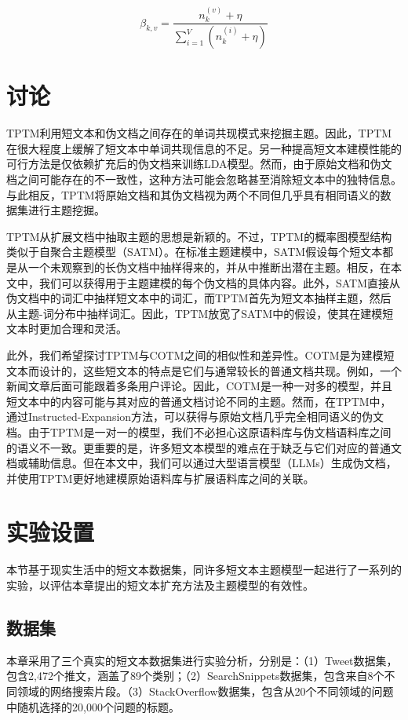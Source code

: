 \begin{equation}
    \label{beta}
    \beta_{k,v}=\frac{n_k^{(v)}+\eta}{\sum_{i=1}^V(n_k^{(i)}+\eta)}
\end{equation} 

\section{讨论}
TPTM利用短文本和伪文档之间存在的单词共现模式来挖掘主题。因此，TPTM在很大程度上缓解了短文本中单词共现信息的不足。另一种提高短文本建模性能的可行方法是仅依赖扩充后的伪文档来训练LDA模型。然而，由于原始文档和伪文档之间可能存在的不一致性，这种方法可能会忽略甚至消除短文本中的独特信息。与此相反，TPTM将原始文档和其伪文档视为两个不同但几乎具有相同语义的数据集进行主题挖掘。

TPTM从扩展文档中抽取主题的思想是新颖的。不过，TPTM的概率图模型结构类似于自聚合主题模型（SATM）\cite{SATM}。在标准主题建模中，SATM假设每个短文本都是从一个未观察到的长伪文档中抽样得来的，并从中推断出潜在主题。相反，在本文中，我们可以获得用于主题建模的每个伪文档的具体内容。此外，SATM直接从伪文档中的词汇中抽样短文本中的词汇，而TPTM首先为短文本抽样主题，然后从主题-词分布中抽样词汇。因此，TPTM放宽了SATM中的假设，使其在建模短文本时更加合理和灵活。

此外，我们希望探讨TPTM与COTM\cite{COTM}之间的相似性和差异性。COTM是为建模短文本而设计的，这些短文本的特点是它们与通常较长的普通文档共现。例如，一个新闻文章后面可能跟着多条用户评论。因此，COTM是一种一对多的模型，并且短文本中的内容可能与其对应的普通文档讨论不同的主题。然而，在TPTM中，通过Instructed-Expansion方法，可以获得与原始文档几乎完全相同语义的伪文档。由于TPTM是一对一的模型，我们不必担心这原语料库与伪文档语料库之间的语义不一致。更重要的是，许多短文本模型的难点在于缺乏与它们对应的普通文档或辅助信息。但在本文中，我们可以通过大型语言模型（LLMs）生成伪文档，并使用TPTM更好地建模原始语料库与扩展语料库之间的关联。

\section{实验设置}
本节基于现实生活中的短文本数据集，同许多短文本主题模型一起进行了一系列的实验，以评估本章提出的短文本扩充方法及主题模型的有效性。

\subsection{数据集}
本章采用了三个真实的短文本数据集进行实验分析，分别是：（1）Tweet\cite{GSDMM}数据集，包含2,472个推文，涵盖了89个类别；（2）SearchSnippets数据集，包含来自8个不同领域的网络搜索片段\cite{SearchSnippets}。（3）StackOverflow数据集，包含从20个不同领域的问题中随机选择的20,000个问题的标题\cite{SearchSnippets}。

